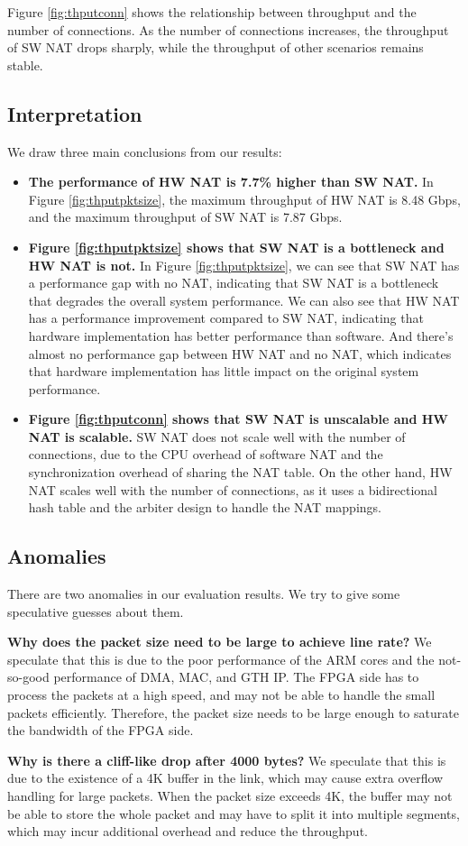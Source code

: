 Figure \ref{fig:thputconn} shows the relationship between throughput and the number of connections. As the number of connections increases, the throughput of SW NAT drops sharply, while the throughput of other scenarios remains stable. 

\subsection{Interpretation}
We draw three main conclusions from our results:
\begin{itemize}
    \item \textbf{The performance of HW NAT is 7.7\% higher than SW NAT.} In Figure \ref{fig:thputpktsize}, the maximum throughput of HW NAT is 8.48 Gbps, and the maximum throughput of SW NAT is 7.87 Gbps.
    \item \textbf{Figure \ref{fig:thputpktsize} shows that SW NAT is a bottleneck and HW NAT is not.}
    In Figure \ref{fig:thputpktsize}, we can see that SW NAT has a performance gap with no NAT, indicating that SW NAT is a bottleneck that degrades the overall system performance. We can also see that HW NAT has a performance improvement compared to SW NAT, indicating that hardware implementation has better performance than software. And there's almost no performance gap between HW NAT and no NAT, which indicates that hardware implementation has little impact on the original system performance.
    \item \textbf{Figure \ref{fig:thputconn} shows that SW NAT is unscalable and HW NAT is scalable.}
    SW NAT does not scale well with the number of connections, due to the CPU overhead of software NAT and the synchronization overhead of sharing the NAT table. On the other hand, HW NAT scales well with the number of connections, as it uses a bidirectional hash table and the arbiter design to handle the NAT mappings.
\end{itemize}






\subsection{Anomalies}
There are two anomalies in our evaluation results. We try to give some speculative guesses about them.

\textbf{Why does the packet size need to be large to achieve line rate?} We speculate that this is due to the poor performance of the ARM cores and the not-so-good performance of DMA, MAC, and GTH IP. The FPGA side has to process the packets at a high speed, and may not be able to handle the small packets efficiently. Therefore, the packet size needs to be large enough to saturate the bandwidth of the FPGA side.

\textbf{Why is there a cliff-like drop after 4000 bytes?} We speculate that this is due to the existence of a 4K buffer in the link, which may cause extra overflow handling for large packets. When the packet size exceeds 4K, the buffer may not be able to store the whole packet and may have to split it into multiple segments, which may incur additional overhead and reduce the throughput.



